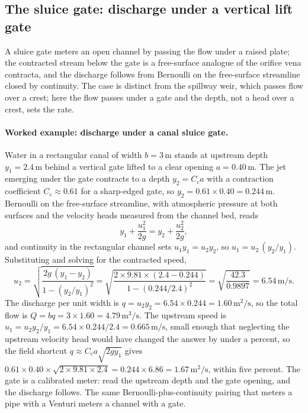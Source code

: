 \subsection{The sluice gate: discharge under a vertical lift gate}

A sluice gate meters an open channel by passing the flow under a raised
plate; the contracted stream below the gate is a free-surface analogue
of the orifice vena contracta, and the discharge follows from Bernoulli
on the free-surface streamline closed by continuity. The case is
distinct from the spillway weir, which passes flow over a crest; here
the flow passes under a gate and the depth, not a head over a crest,
sets the rate.

\paragraph{Worked example: discharge under a canal sluice gate.} Water
in a rectangular canal of width $b = 3\,\si{\meter}$ stands at upstream
depth $y_1 = 2.4\,\si{\meter}$ behind a vertical gate lifted to a clear
opening $a = 0.40\,\si{\meter}$. The jet emerging under the gate
contracts to a depth $y_2 = C_c a$ with a contraction coefficient
$C_c \approx 0.61$ for a sharp-edged gate, so $y_2 = 0.61\times 0.40 =
0.244\,\si{\meter}$. Bernoulli on the free-surface streamline, with
atmospheric pressure at both surfaces and the velocity heads measured
from the channel bed, reads
\[
y_1 + \frac{u_1^2}{2g} = y_2 + \frac{u_2^2}{2g},
\]
and continuity in the rectangular channel sets $u_1 y_1 = u_2 y_2$, so
$u_1 = u_2\,(y_2/y_1)$. Substituting and solving for the contracted
speed,
\[
u_2 = \sqrt{\frac{2g\,(y_1 - y_2)}{1 - (y_2/y_1)^2}}
= \sqrt{\frac{2\times 9.81\times(2.4 - 0.244)}
{1 - (0.244/2.4)^2}}
= \sqrt{\frac{42.3}{0.9897}}
= 6.54\,\si{\meter\per\second}.
\]
The discharge per unit width is $q = u_2 y_2 = 6.54\times 0.244 =
1.60\,\si{\meter}^2/\si{\second}$, so the total flow is $Q = b q =
3\times 1.60 = 4.79\,\si{\meter\cubed\per\second}$. The upstream speed
is $u_1 = u_2 y_2/y_1 = 6.54\times 0.244/2.4 = 0.665\,\si{\meter\per
\second}$, small enough that neglecting the upstream velocity head would
have changed the answer by under a percent, so the field shortcut
$q \approx C_c a\sqrt{2g y_1}$ gives $0.61\times 0.40\times\sqrt{2\times
9.81\times 2.4} = 0.244\times 6.86 = 1.67\,\si{\meter}^2/\si{\second}$,
within five percent. The gate is a calibrated meter: read the upstream
depth and the gate opening, and the discharge follows. The same
Bernoulli-plus-continuity pairing that meters a pipe with a Venturi
meters a channel with a gate.

